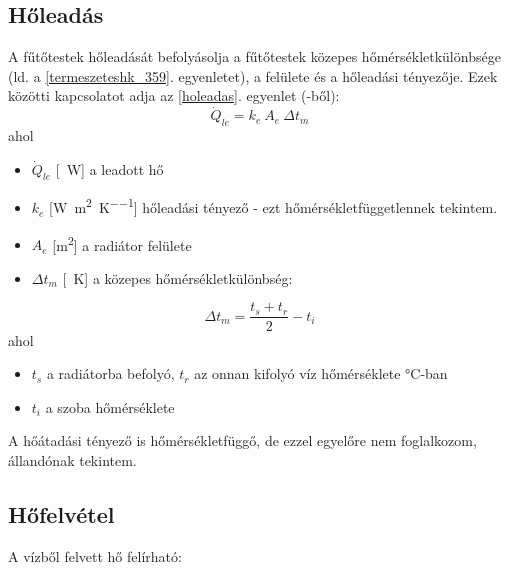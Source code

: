 \subsection{Hőleadás}
A fűtőtestek hőleadását befolyásolja a fűtőtestek közepes hőmérsékletkülönbsége (ld. a \ref{termeszeteshk_359}. egyenletet), a felülete és a hőleadási tényezője.
%
Ezek közötti kapcsolatot adja az \ref{holeadas}. egyenlet (\cite[358.~o.]{Herz}-ből): 
\begin{equation} \label{holeadas}
\dot Q_{le} = k_e ~ A_e ~ \Delta t_m
\end{equation}
%
%
ahol
\begin{itemize}[itemsep=6pt,topsep=0pt,parsep=0pt,partopsep=0pt]
\item[] $\dot{Q}_{le}$ [\SI{}{\watt}] a leadott hő
\item[] $k_e$ [\si[per-mode = fraction]{\watt\per\meter\squared\per\kelvin}] hőleadási tényező - ezt hőmérsékletfüggetlennek tekintem.
\item[] $A_e$ [\si{\metre\squared}] a radiátor felülete
\item[] $\Delta t_m$ [\SI{}{\kelvin}] a közepes hőmérsékletkülönbség:
\end{itemize}
%
\begin{equation} \label{termeszeteshk_359}
\Delta t_m = \frac{t_s+t_r}{2} -t_{i}
\end{equation}
ahol
%
\begin{itemize}[itemsep=6pt,topsep=0pt,parsep=0pt,partopsep=0pt]
	\item[] $t_s$ a radiátorba befolyó, $t_r$ az onnan kifolyó víz hőmérséklete \si{\degreeCelsius}-ban
	\item[] $t_i$ a szoba hőmérséklete
\end{itemize}
%
A hőátadási tényező is hőmérsékletfüggő, de ezzel egyelőre nem foglalkozom, állandónak tekintem.
%
%
%
%

\subsection{Hőfelvétel}
A vízből felvett hő felírható:

